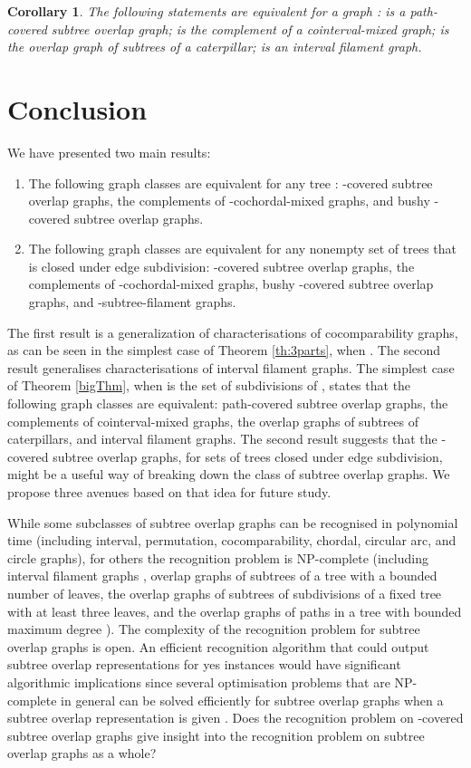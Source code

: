 \documentclass[
final
]{dmtcs-episciences}        \usepackage{graphics, amsthm, amsmath, amssymb, algorithm, algorithmic}
\newtheorem{corollary}{Corollary}
\begin{document}
\begin{corollary}
The following statements are equivalent for a graph :
 is a path-covered subtree overlap graph;
 is the complement of a cointerval-mixed graph;
 is the overlap graph of subtrees of a caterpillar;
 is an interval filament graph.
\end{corollary}


\section{Conclusion}

We have presented two main results: 

\begin{enumerate}
\item
The following graph classes are equivalent for any tree : -covered subtree overlap graphs, the complements of -cochordal-mixed graphs, and bushy -covered subtree overlap graphs.
\item
The following graph classes are equivalent for any nonempty set of trees  that is closed under edge subdivision:
-covered subtree overlap graphs,
the complements of -cochordal-mixed graphs,
bushy -covered subtree overlap graphs,
and -subtree-filament graphs.
\end{enumerate}

The first result is a generalization of characterisations of cocomparability graphs, as can be seen in the simplest case of Theorem \ref{th:3parts}, when . 
The second result generalises characterisations of interval filament graphs. The simplest case of Theorem \ref{bigThm}, when  is the set of subdivisions of , states that the following graph classes are equivalent: path-covered subtree overlap graphs, the complements of cointerval-mixed graphs, the overlap graphs of subtrees of caterpillars, and interval filament graphs.
The second result suggests that the -covered subtree overlap graphs, for sets  of trees closed under edge subdivision, might be a useful way of breaking down the class of subtree overlap graphs. We propose three avenues based on that idea for future study.


While some subclasses of subtree overlap graphs can be recognised in polynomial time (including interval, permutation, cocomparability, chordal, circular arc, and circle graphs), for others the recognition problem is NP-complete (including interval filament graphs \cite{Perm},  overlap graphs of subtrees of a tree with a bounded number of leaves, the overlap graphs of subtrees of subdivisions of a fixed tree with at least three leaves, and the overlap graphs of paths in a tree with bounded maximum degree \cite{JessThesis,PergelThesis}). The complexity of the recognition problem for subtree overlap graphs is open.  
An efficient recognition algorithm that could output subtree overlap representations for yes instances would have significant algorithmic implications since several optimisation problems that are NP-complete in general can be solved efficiently for subtree overlap graphs when a subtree overlap representation is given \cite{eowynStewart, gavril2007, gavril2009, gavril2011, Keil}. Does the recognition problem on -covered subtree overlap graphs give insight into the recognition problem on subtree overlap graphs as a whole?
\end{document}
